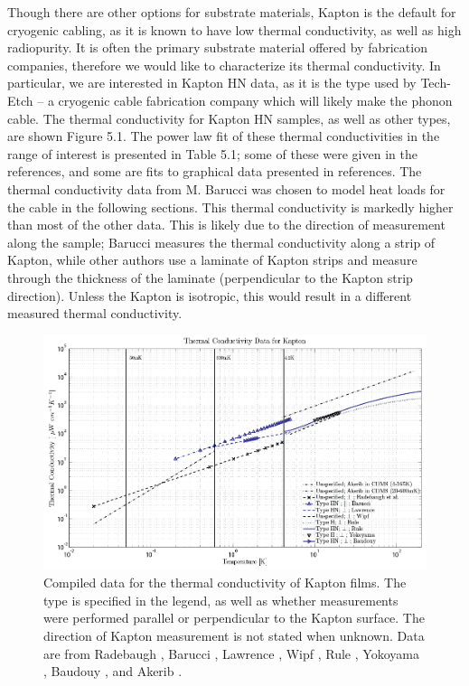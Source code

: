 \documentclass{report}
\begin{document}
Though there are other options for substrate materials, Kapton is the default for cryogenic cabling, as it is known to have low thermal conductivity, as well as high radiopurity. It is often the primary substrate material offered by fabrication companies, therefore we would like to characterize its thermal conductivity. In particular, we are interested in Kapton HN data, as it is the type used by Tech-Etch -- a cryogenic cable fabrication company which will likely make the phonon cable. The thermal conductivity for Kapton HN samples, as well as other types, are shown Figure 5.1. The power law fit of these thermal conductivities in the range of interest is presented in Table 5.1; some of these were given in the references, and some are fits to graphical data presented in references. The thermal conductivity data from M. Barucci \cite{bar} was chosen to model heat loads for the cable in the following sections. This thermal conductivity is markedly higher than most of the other data. This is likely due to the direction of measurement along the sample; Barucci measures the thermal conductivity along a strip of Kapton, while other authors use a laminate of Kapton strips and measure through the thickness of the laminate (perpendicular to the Kapton strip direction). Unless the Kapton is isotropic, this would result in a different measured thermal conductivity.

\begin{figure}[h]
\includegraphics[width = .9\textwidth]{Kapton_var.png}
\caption{Compiled data for the thermal conductivity of Kapton films. The type is specified in the legend, as well as whether measurements were performed parallel or perpendicular to the Kapton surface. The direction of Kapton measurement is not stated when unknown. Data are from Radebaugh \cite{rad73}, Barucci \cite{bar}, Lawrence \cite{law}, Wipf \cite{wip}, Rule \cite{Rule1996}, Yokoyama \cite{yok}, Baudouy \cite{Baudouy2003}, and Akerib \cite{Akerib}. }
\end{figure}
\end{document}
